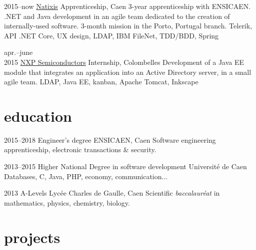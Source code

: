 \documentclass[]{friggeri-cv}
\begin{document}
\begin{entrylist}
    \entry
    {2015--now}
    {\href{https://www.natixis.com}{Natixis}}
    {Apprenticeship, Caen}
    {3-year apprenticeship with ENSICAEN. \csharp .NET and Java development in an agile team dedicated to the creation of internally-used software. 3-month mission in the Porto, Portugal branch.}
    {Telerik, API .NET Core, UX design, LDAP, IBM FileNet, TDD/BDD, Spring}
    
    \entry
    {apr.--june\\2015}
    {\href{https://www.nxp.com}{NXP Semiconductors}}
    {Internship, Colombelles}
    {Development of a Java EE module that integrates an application into an Active Directory server, in a small agile team.}
    {LDAP, Java EE, kanban, Apache Tomcat, Inkscape}
\end{entrylist}

\section{education}

\begin{entrylist}
    \entry
    {2015--2018}
    {Engineer's degree}
    {ENSICAEN, Caen}
    {Software engineering apprenticeship, electronic transactions \& security.}{}
    
    \entry
    {2013--2015}
    {Higher National Degree {\normalfont in software development}}
    {Université de Caen}
    {Databases, C, Java, PHP, economy, communication...}{}
    
    \entry
    {2013}
    {A-Levels}
    {Lycée Charles de Gaulle, Caen}
    {Scientific \textit{baccalauréat} in mathematics, physics, chemistry, biology.}{}
\end{entrylist}

\section{projects}
\end{document}
